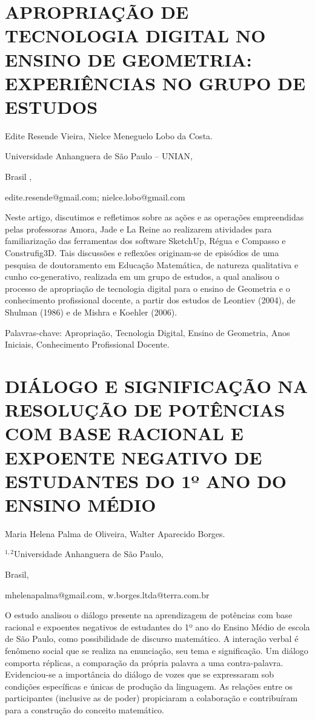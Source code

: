 \section{APROPRIAÇÃO DE TECNOLOGIA DIGITAL NO ENSINO DE GEOMETRIA: EXPERIÊNCIAS
NO GRUPO DE ESTUDOS}

\begin{datos}

Edite Resende Vieira, Nielce Meneguelo Lobo da Costa.

Universidade Anhanguera de São Paulo – UNIAN,

Brasil ,

edite.resende@gmail.com; nielce.lobo@gmail.com

\end{datos}

Neste artigo, discutimos e refletimos sobre as ações e as operações
empreendidas pelas professoras Amora, Jade e La Reine ao realizarem
atividades para familiarização das ferramentas dos software SketchUp,
Régua e Compasso e Construfig3D. Tais discussões e reflexões originam-se
de episódios de uma pesquisa de doutoramento em Educação Matemática,
de natureza qualitativa e cunho co-generativo, realizada em um grupo
de estudos, a qual analisou o processo de apropriação de tecnologia
digital para o ensino de Geometria e o conhecimento profissional docente,
a partir dos estudos de Leontiev (2004), de Shulman (1986) e de Mishra
e Koehler (2006). 

Palavras-chave: Apropriação, Tecnologia Digital, Ensino de Geometria,
Anos Iniciais, Conhecimento Profissional Docente.


\section{DIÁLOGO E SIGNIFICAÇÃO NA RESOLUÇÃO DE POTÊNCIAS COM BASE RACIONAL
E EXPOENTE NEGATIVO DE ESTUDANTES DO 1º ANO DO ENSINO MÉDIO}

\begin{datos}

\textonesuperior{}Maria Helena Palma de Oliveira, \texttwosuperior{}Walter
Aparecido Borges. 

$^{1,2}$Universidade Anhanguera de São Paulo,

Brasil,

\textonesuperior{}mhelenapalma@gmail.com, \texttwosuperior{}w.borges.ltda@terra.com.br

\end{datos}

O estudo analisou o diálogo presente na aprendizagem de potências
com base racional e expoentes negativos de estudantes do 1º ano do
Ensino Médio de escola de São Paulo, como possibilidade de discurso
matemático. A interação verbal é fenômeno social que se realiza na
enunciação, seu tema e significação. Um diálogo comporta réplicas,
a comparação da própria palavra a uma contra-palavra. Evidenciou-se
a importância do diálogo de vozes que se expressaram sob condições
específicas e únicas de produção da linguagem. As relações entre os
participantes (inclusive as de poder) propiciaram a colaboração e
contribuíram para a construção do conceito matemático. 


